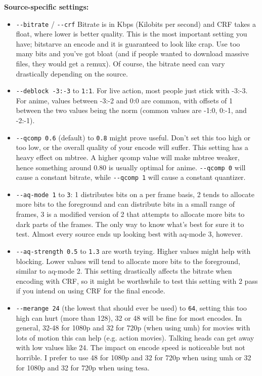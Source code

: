 \documentclass{scrartcl}
\begin{document}
\textbf{Source-specific settings:}
\begin{itemize}
\item \texttt{-{}-bitrate} / \texttt{-{}-crf} Bitrate is in Kbps (Kilobits per second) and CRF takes a float, where lower is better quality. This is the most important setting you have; bitstarve an encode and it is guaranteed to look like crap. Use too many bits and you've got bloat (and if people wanted to download massive files, they would get a remux). Of course, the bitrate need can vary drastically depending on the source.
\item \texttt{-{}-deblock -3:-3} to \texttt{1:1}. For live action, most people just stick with -3:-3.  For anime, values between -3:-2 and 0:0 are common, with offsets of 1 between the two values being the norm (common values are -1:0, 0:-1, and -2:-1).
\item \texttt{-{}-qcomp 0.6} (default) to \texttt{0.8} might prove useful. Don't set this too high or too low, or the overall quality of your encode will suffer. This setting has a heavy effect on mbtree. A higher qcomp value will make mbtree weaker, hence something around 0.80 is usually optimal for anime. \texttt{-{}-qcomp 0} will cause a constant bitrate, while \texttt{-{}-qcomp 1} will cause a constant quantizer.
\item \texttt{-{}-aq-mode 1} to \texttt{3}: 1 distributes bits on a per frame basis, 2 tends to allocate more bits to the foreground and can distribute bits in a small range of frames, 3 is a modified version of 2 that attempts to allocate more bits to dark parts of the frames. The only way to know what's best for sure it to test.  Almost every source ends up looking best with aq-mode 3, however.
\item \texttt{-{}-aq-strength 0.5} to \texttt{1.3} are worth trying. Higher values might help with blocking. Lower values will tend to allocate more bits to the foreground, similar to aq-mode 2. This setting drastically affects the bitrate when encoding with CRF, so it might be worthwhile to test this setting with 2 pass if you intend on using CRF for the final encode.
\item \texttt{-{}-merange 24} (the lowest that should ever be used) to \texttt{64}, setting this too high can hurt (more than 128), 32 or 48 will be fine for most encodes. In general, 32-48 for 1080p and 32 for 720p (when using umh) for movies with lots of motion this can help (e.g. action movies). Talking heads can get away with low values like 24. The impact on encode speed is noticeable but not horrible. I prefer to use 48 for 1080p and 32 for 720p when using umh or 32 for 1080p and 32 for 720p when using tesa.

\end{itemize}
\end{document}
